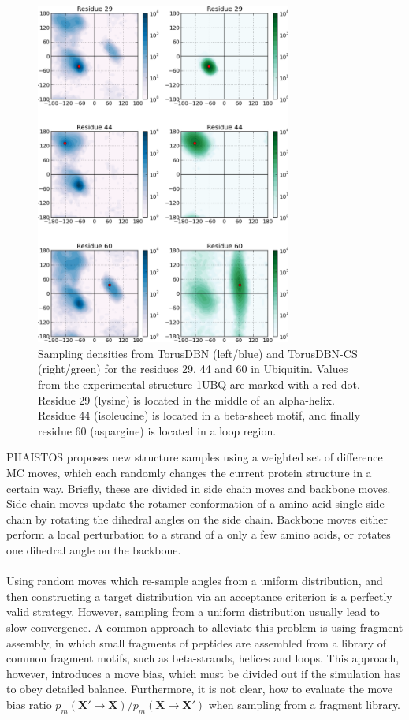 \begin{figure}
    \centering
    \includegraphics[width=0.75\textwidth]{figures/torus_versions.pdf}
    \caption{Sampling densities from TorusDBN (left/blue) and TorusDBN-CS (right/green) for the residues 29, 44 and 60 in Ubiquitin. Values from the experimental structure 1UBQ are marked with a red dot. Residue 29 (lysine) is located in the middle of an alpha-helix. Residue 44 (isoleucine) is located in a beta-sheet motif, and finally residue 60 (aspargine) is located in a loop region.}
    \label{fig:torus}
\end{figure}

PHAISTOS proposes new structure samples using a weighted set of difference MC moves, which each randomly changes the current protein structure in a certain way. Briefly, these are divided in side chain moves and backbone moves.
Side chain moves update the rotamer-conformation of a amino-acid single side chain by rotating the dihedral angles on the side chain.
Backbone moves either perform a local perturbation to a strand of a only a few amino acids, or rotates one dihedral angle on the backbone.
\\\\Using random moves which re-sample angles from a uniform distribution, and then constructing a target distribution via an acceptance criterion is a perfectly valid strategy.
However, sampling from a uniform distribution usually lead to slow convergence.
A common approach to alleviate this problem is using fragment assembly, in which small fragments of peptides are assembled from a library of common fragment motifs, such as beta-strands, helices and loops.
This approach, however, introduces a move bias, which must be divided out if the simulation has to obey detailed balance.
Furthermore, it is not clear, how to evaluate the move bias ratio $p_m(\mathbf{X'} \rightarrow \mathbf{X}) / p_m(\mathbf{X} \rightarrow \mathbf{X'})$ when sampling from a fragment library.


